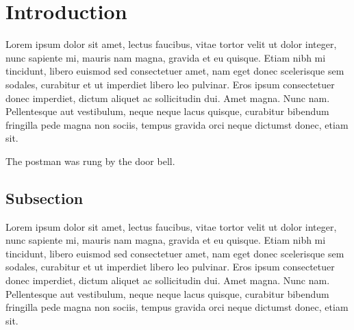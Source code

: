\documentclass[letterpaper, 12pt, dvips]{mitwpl}
\begin{document}


\author{Noam Chomsky\\Morris Halle}

\maketitle


\section{Introduction}

Lorem ipsum dolor sit amet, lectus faucibus, vitae tortor velit ut dolor integer, nunc sapiente mi, mauris nam magna, gravida et eu quisque. Etiam nibh mi tincidunt, libero euismod sed consectetuer amet, nam eget donec scelerisque sem sodales, curabitur et ut imperdiet libero leo pulvinar. Eros ipsum consectetuer donec imperdiet, dictum aliquet ac sollicitudin dui. Amet magna. Nunc nam. Pellentesque aut vestibulum, neque neque lacus quisque, curabitur bibendum fringilla pede magna non sociis, tempus gravida orci neque dictumst donec, etiam sit.

\begin{exe}
	\ex The postman was rung by the door bell.
\end{exe}

\subsection{Subsection}

Lorem ipsum dolor sit amet, lectus faucibus, vitae tortor velit ut dolor integer, nunc sapiente mi, mauris nam magna, gravida et eu quisque. Etiam nibh mi tincidunt, libero euismod sed consectetuer amet, nam eget donec scelerisque sem sodales, curabitur et ut imperdiet libero leo pulvinar. Eros ipsum consectetuer donec imperdiet, dictum aliquet ac sollicitudin dui. Amet magna. Nunc nam. Pellentesque aut vestibulum, neque neque lacus quisque, curabitur bibendum fringilla pede magna non sociis, tempus gravida orci neque dictumst donec, etiam sit. \citep{MacFarlane:2005}
\end{document}
